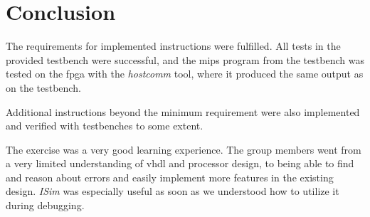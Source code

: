 \chapter{Conclusion}
The requirements for implemented instructions were fulfilled.
All tests in the provided testbench were successful,
and the \gls{mips} program from the testbench was tested on the \gls{fpga} with the \textit{hostcomm} tool,
where it produced the same output as on the testbench.

Additional instructions beyond the minimum requirement were also implemented and verified with testbenches to some extent.

The exercise was a very good learning experience.
The group members went from a very limited understanding of \gls{vhdl} and processor design,
to being able to find and reason about errors and easily implement more features in the existing design.
\textit{ISim} was especially useful as soon as we understood how to utilize it during debugging.
